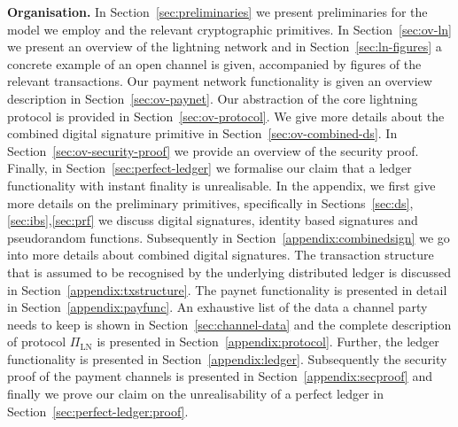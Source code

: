 \noindent \textbf{Organisation.} In Section~\ref{sec:preliminaries} we present
preliminaries for the model we employ and the relevant cryptographic primitives.
In Section~\ref{sec:ov-ln} we present an overview of the lightning network and
in Section~\ref{sec:ln-figures} a concrete example of an open channel is given,
accompanied by figures of the relevant transactions. Our payment network
functionality is given an overview description in Section~\ref{sec:ov-paynet}.
Our abstraction of the core lightning protocol is provided in
Section~\ref{sec:ov-protocol}. We give more details about the combined digital
signature primitive in Section~\ref{sec:ov-combined-ds}. In
Section~\ref{sec:ov-security-proof} we provide an overview of the security
proof. Finally, in Section~\ref{sec:perfect-ledger} we formalise our claim that
a ledger functionality with instant finality is unrealisable. In the appendix,
we first give more details on the preliminary primitives, specifically in
Sections~\ref{sec:ds},\ref{sec:ibs},\ref{sec:prf} we discuss digital signatures,
identity based signatures and pseudorandom functions. Subsequently in
Section~\ref{appendix:combinedsign} we go into more details about combined
digital signatures. The transaction structure that is assumed to be recognised
by the underlying distributed ledger is discussed in
Section~\ref{appendix:txstructure}. The paynet functionality is presented in
detail in Section~\ref{appendix:payfunc}. An exhaustive list of the data a
channel party needs to keep is shown in Section~\ref{sec:channel-data} and the
complete description of protocol $\Pi_{\mathrm{LN}}$ is presented in
Section~\ref{appendix:protocol}. Further, the ledger functionality is presented
in Section~\ref{appendix:ledger}. Subsequently the security proof of the payment
channels is presented in Section~\ref{appendix:secproof} and finally we prove
our claim on the unrealisability of a perfect ledger in
Section~\ref{sec:perfect-ledger:proof}.
